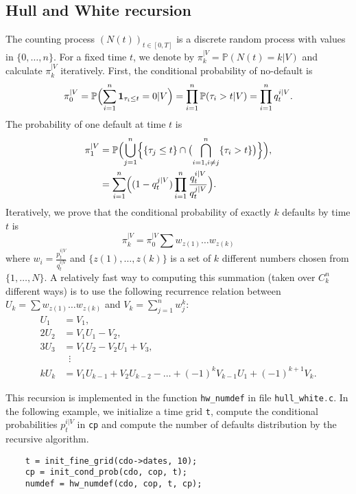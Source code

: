 \documentclass[10pt, a4paper]{article}
\newcommand{\code}[1]{{\upshape \lstinline[language=c]{#1}}}
\renewcommand{\P}{\mathbb{P}}
\begin{document}
\subsection{Hull and White recursion}
The counting process $(N(t))_{t \in [0,T]}$ is a discrete random process with values in $\{0, \dots, n\}$. For a fixed time $t$, we denote by $\pi^{|V}_k = \P(N(t) = k | V)$ and calculate $\pi^{|V}_k$ iteratively.
First, the conditional probability of no-default is 
\begin{equation*}
    \pi^{|V}_0 = \P \Bigl( \sum_{i=1}^n \mathbf{1}_{\tau_i \le t} = 0 | V \Bigr) = \prod_{i=1}^n \P (\tau_i > t | V) = \prod_{i=1}^n q_t^{i|V}.
\end{equation*}
The probability of one default at time $t$ is 
\begin{align*}
    \pi^{|V}_1 &= \P \Bigl( \bigcup_{j=1}^n \Bigl\{ \{\tau_j \le t\} \cap \bigl( \bigcap_{i=1,i \neq j}^n \{\tau_i > t\} \bigr) \Bigr\} \Bigr), \\
    &= \sum_{i=1}^n \Bigl( (1-q_t^{j|V}) \prod_{i=1}^n \frac{q_t^{i|V}}{q_t^{j|V}} \Bigr).
\end{align*}
Iteratively, we prove that the conditional probability of exactly $k$ defaults by time $t$ is 
\begin{equation*}
    \pi^{|V}_k = \pi^{|V}_0 \sum w_{z(1)} \dots w_{z(k)}
\end{equation*}
where $w_i = \frac{p_t^{i|V}}{q_t^{i|V}}$ and $\{z(1),\dots,z(k)\}$ is a set of $k$ different numbers chosen from $\{1,\dots,N\}$. A relatively fast way to computing this summation (taken over $C_k^n$ different ways) is to use the following recurrence relation between $U_k = \sum w_{z(1)} \dots w_{z(k)}$ and $V_k = \sum_{j=1}^n w_{j}^k$: 
\begin{align*}
    U_1 &= V_1, \\
    2 U_2 &= V_1 U_1 - V_2, \\
    3 U_3 &= V_1 U_2 - V_2 U_1 + V_3, \\
    & \;\; \vdots \\
    k U_k &= V_1 U_{k-1} + V_2 U_{k-2} - \dots + (-1)^k V_{k-1} U_1 + (-1)^{k+1} V_k.
\end{align*}

This recursion is implemented in the function \code{hw_numdef} in file \code{hull_white.c}. In the following example, we initialize a time grid \code{t}, compute the conditional probabilities $p_t^{i|V}$ in \code{cp} and compute the number of defaults distribution by the recursive algorithm. 
\begin{lstlisting}
    t = init_fine_grid(cdo->dates, 10);
    cp = init_cond_prob(cdo, cop, t);
    numdef = hw_numdef(cdo, cop, t, cp);
\end{lstlisting}
\end{document}
